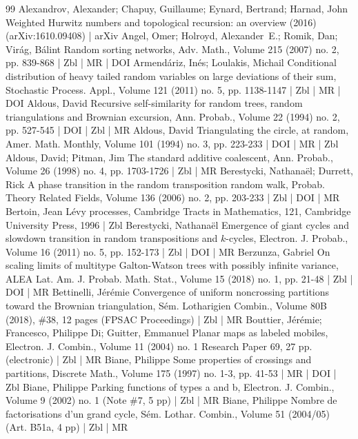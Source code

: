 \documentclass[10pt]{amsart}
\theoremstyle{definition}\newtheorem{defi}[theo]{Definition}\newtheorem{rema}[theo]{Remark}\newtheorem{exam}[theo]{Example}\newtheorem{exem}[theo]{Example}\newtheorem{nota}[theo]{Notation}
\begin{document}
\begin{thebibliography}{99}
Alexandrov, Alexander; Chapuy, Guillaume; Eynard, Bertrand; Harnad, John Weighted Hurwitz numbers and topological recursion: an overview (2016) (arXiv:1610.09408) | arXiv
Angel, Omer; Holroyd, Alexander E.; Romik, Dan; Virág, Bálint Random sorting networks, Adv. Math., Volume 215 (2007) no. 2, pp. 839-868 | Zbl | MR | DOI
Armendáriz, Inés; Loulakis, Michail Conditional distribution of heavy tailed random variables on large deviations of their sum, Stochastic Process. Appl., Volume 121 (2011) no. 5, pp. 1138-1147 | Zbl | MR | DOI
Aldous, David Recursive self-similarity for random trees, random triangulations and Brownian excursion, Ann. Probab., Volume 22 (1994) no. 2, pp. 527-545 | DOI | Zbl | MR
Aldous, David Triangulating the circle, at random, Amer. Math. Monthly, Volume 101 (1994) no. 3, pp. 223-233 | DOI | MR | Zbl
Aldous, David; Pitman, Jim The standard additive coalescent, Ann. Probab., Volume 26 (1998) no. 4, pp. 1703-1726 | Zbl | MR
Berestycki, Nathanaël; Durrett, Rick A phase transition in the random transposition random walk, Probab. Theory Related Fields, Volume 136 (2006) no. 2, pp. 203-233 | Zbl | DOI | MR
Bertoin, Jean Lévy processes, Cambridge Tracts in Mathematics, 121, Cambridge University Press, 1996 | Zbl
Berestycki, Nathanaël Emergence of giant cycles and slowdown transition in random transpositions and $k$-cycles, Electron. J. Probab., Volume 16 (2011) no. 5, pp. 152-173 | Zbl | DOI | MR
Berzunza, Gabriel On scaling limits of multitype Galton-Watson trees with possibly infinite variance, ALEA Lat. Am. J. Probab. Math. Stat., Volume 15 (2018) no. 1, pp. 21-48 | Zbl | DOI | MR
Bettinelli, Jérémie Convergence of uniform noncrossing partitions toward the Brownian triangulation, Sém. Lotharigien Combin., Volume 80B (2018), \#38, 12 pages (FPSAC Proceedings) | Zbl | MR
Bouttier, Jérémie; Francesco, Philippe Di; Guitter, Emmanuel Planar maps as labeled mobiles, Electron. J. Combin., Volume 11 (2004) no. 1 Research Paper 69, 27 pp. (electronic) | Zbl | MR
Biane, Philippe Some properties of crossings and partitions, Discrete Math., Volume 175 (1997) no. 1-3, pp. 41-53 | MR | DOI | Zbl
Biane, Philippe Parking functions of types a and b, Electron. J. Combin., Volume 9 (2002) no. 1 (Note \#7, 5 pp) | Zbl | MR
Biane, Philippe Nombre de factorisations d’un grand cycle, Sém. Lothar. Combin., Volume 51 (2004/05) (Art. B51a, 4 pp) | Zbl | MR

\end{thebibliography}
\end{document}
